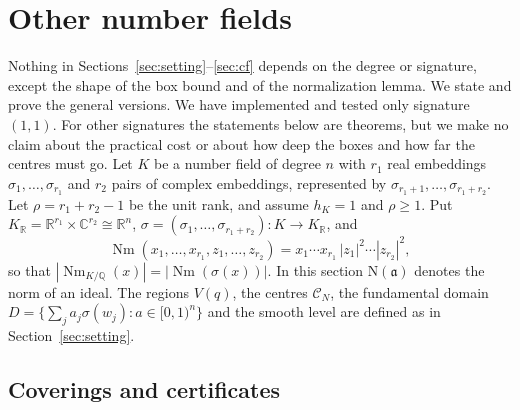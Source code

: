 \documentclass[11pt]{amsart}
\theoremstyle{definition}
\theoremstyle{remark}
\numberwithin{equation}{section}
\newcommand{\Q}{\mathbb{Q}}
\newcommand{\R}{\mathbb{R}}
\newcommand{\C}{\mathbb{C}}
\newcommand{\Nm}{\operatorname{Nm}}
\begin{document}
\section{Other number fields}\label{sec:general}

Nothing in Sections~\ref{sec:setting}--\ref{sec:cf} depends on the degree or signature, except
the shape of the box bound and of the normalization lemma. We state and prove the general
versions. We have implemented and tested only signature $(1,1)$. For other signatures the
statements below are theorems, but we make no claim about the practical cost or about how
deep the boxes and how far the centres must go. Let
$K$ be a number field of degree $n$ with $r_1$ real embeddings $\sigma_1,\dots,\sigma_{r_1}$ and
$r_2$ pairs of complex embeddings, represented by $\sigma_{r_1+1},\dots,\sigma_{r_1+r_2}$. Let
$\rho=r_1+r_2-1$ be the unit rank, and assume $h_K=1$ and $\rho\ge1$. Put
$K_\R=\R^{r_1}\times\C^{r_2}\cong\R^n$, $\sigma=(\sigma_1,\dots,\sigma_{r_1+r_2})\colon K\to K_\R$, and
\[
  \Nm(x_1,\dots,x_{r_1},z_1,\dots,z_{r_2})=x_1\cdots x_{r_1}\,|z_1|^2\cdots|z_{r_2}|^2 ,
\]
so that $|\Nm_{K/\Q}(x)|=|\Nm(\sigma(x))|$. In this section $\mathrm N(\mathfrak a)$ denotes the
norm of an ideal. The regions $V(q)$, the centres $\mathcal C_N$, the fundamental domain
$D=\{\sum_ja_j\sigma(w_j):a\in[0,1)^n\}$ and the smooth level are defined as in
Section~\ref{sec:setting}.

\subsection{Coverings and certificates}
\end{document}
